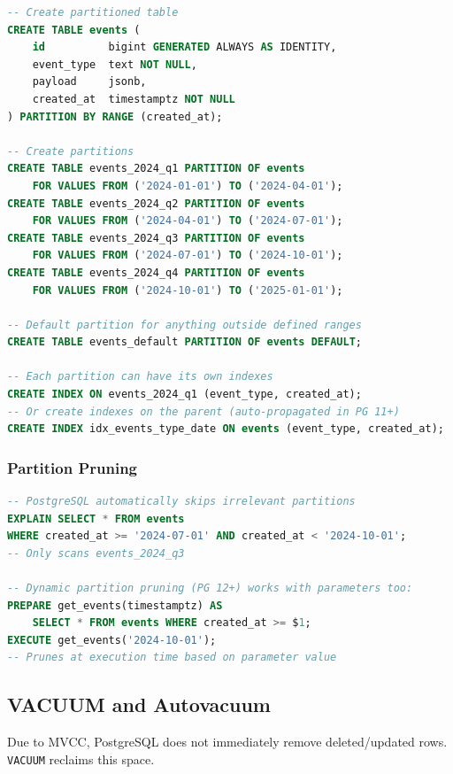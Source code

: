 \documentclass[12pt,a4paper]{article}
\begin{document}
\begin{lstlisting}[language=SQL, caption={Range partitioning example}]
-- Create partitioned table
CREATE TABLE events (
    id          bigint GENERATED ALWAYS AS IDENTITY,
    event_type  text NOT NULL,
    payload     jsonb,
    created_at  timestamptz NOT NULL
) PARTITION BY RANGE (created_at);

-- Create partitions
CREATE TABLE events_2024_q1 PARTITION OF events
    FOR VALUES FROM ('2024-01-01') TO ('2024-04-01');
CREATE TABLE events_2024_q2 PARTITION OF events
    FOR VALUES FROM ('2024-04-01') TO ('2024-07-01');
CREATE TABLE events_2024_q3 PARTITION OF events
    FOR VALUES FROM ('2024-07-01') TO ('2024-10-01');
CREATE TABLE events_2024_q4 PARTITION OF events
    FOR VALUES FROM ('2024-10-01') TO ('2025-01-01');

-- Default partition for anything outside defined ranges
CREATE TABLE events_default PARTITION OF events DEFAULT;

-- Each partition can have its own indexes
CREATE INDEX ON events_2024_q1 (event_type, created_at);
-- Or create indexes on the parent (auto-propagated in PG 11+)
CREATE INDEX idx_events_type_date ON events (event_type, created_at);
\end{lstlisting}

\subsubsection{Partition Pruning}

\begin{lstlisting}[language=SQL, caption={Partition pruning}]
-- PostgreSQL automatically skips irrelevant partitions
EXPLAIN SELECT * FROM events
WHERE created_at >= '2024-07-01' AND created_at < '2024-10-01';
-- Only scans events_2024_q3

-- Dynamic partition pruning (PG 12+) works with parameters too:
PREPARE get_events(timestamptz) AS
    SELECT * FROM events WHERE created_at >= $1;
EXECUTE get_events('2024-10-01');
-- Prunes at execution time based on parameter value
\end{lstlisting}

\subsection{VACUUM and Autovacuum}

Due to MVCC, PostgreSQL does not immediately remove deleted/updated rows. \texttt{VACUUM} reclaims this space.
\end{document}
